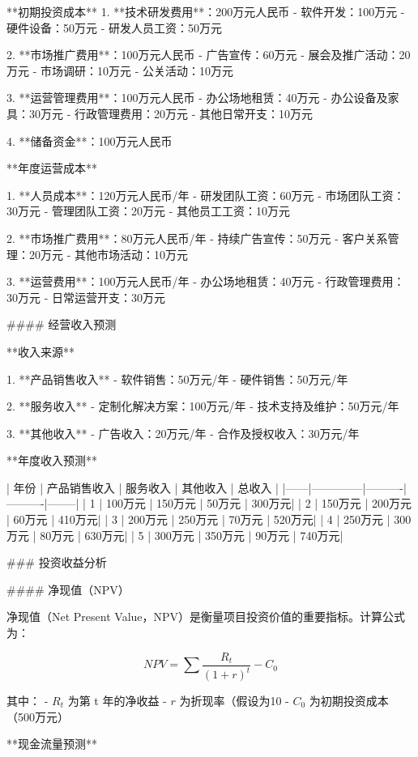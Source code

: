 **初期投资成本**
1. **技术研发费用**：200万元人民币
   - 软件开发：100万元
   - 硬件设备：50万元
   - 研发人员工资：50万元

2. **市场推广费用**：100万元人民币
   - 广告宣传：60万元
   - 展会及推广活动：20万元
   - 市场调研：10万元
   - 公关活动：10万元

3. **运营管理费用**：100万元人民币
   - 办公场地租赁：40万元
   - 办公设备及家具：30万元
   - 行政管理费用：20万元
   - 其他日常开支：10万元

4. **储备资金**：100万元人民币

**年度运营成本**

1. **人员成本**：120万元人民币/年
   - 研发团队工资：60万元
   - 市场团队工资：30万元
   - 管理团队工资：20万元
   - 其他员工工资：10万元

2. **市场推广费用**：80万元人民币/年
   - 持续广告宣传：50万元
   - 客户关系管理：20万元
   - 其他市场活动：10万元

3. **运营费用**：100万元人民币/年
   - 办公场地租赁：40万元
   - 行政管理费用：30万元
   - 日常运营开支：30万元

#### 经营收入预测

**收入来源**

1. **产品销售收入**
   - 软件销售：50万元/年
   - 硬件销售：50万元/年

2. **服务收入**
   - 定制化解决方案：100万元/年
   - 技术支持及维护：50万元/年

3. **其他收入**
   - 广告收入：20万元/年
   - 合作及授权收入：30万元/年

**年度收入预测**

| 年份 | 产品销售收入 | 服务收入 | 其他收入 | 总收入 |
|------|--------------|----------|----------|--------|
| 1    | 100万元      | 150万元  | 50万元   | 300万元|
| 2    | 150万元      | 200万元  | 60万元   | 410万元|
| 3    | 200万元      | 250万元  | 70万元   | 520万元|
| 4    | 250万元      | 300万元  | 80万元   | 630万元|
| 5    | 300万元      | 350万元  | 90万元   | 740万元|

### 投资收益分析

#### 净现值（NPV）

净现值（Net Present Value，NPV）是衡量项目投资价值的重要指标。计算公式为：

\[ NPV = \sum \frac{R_t}{(1 + r)^t} - C_0 \]

其中：
- \( R_t \) 为第 t 年的净收益
- \( r \) 为折现率（假设为10%
- \( C_0 \) 为初期投资成本（500万元）

**现金流量预测**


